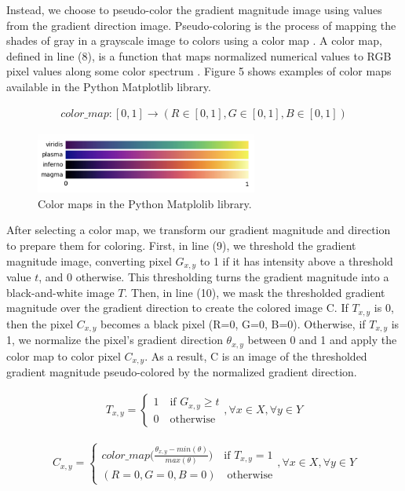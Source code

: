 \documentclass[runningheads]{llncs}
\begin{document}
Instead, we choose to pseudo-color the gradient magnitude image using values from the gradient direction image. Pseudo-coloring is the process of mapping the shades of gray in a grayscale image to colors using a color map \cite{pseudo_color}. A color map, defined in line (8), is a function that maps normalized numerical values to RGB pixel values along some color spectrum \cite{color_map}. Figure 5 shows examples of color maps available in the Python Matplotlib library.

\begin{align}
color\_map: [0, 1] \rightarrow (R \in [0,1], G \in [0,1], B \in [0,1])
\end{align}

\begin{figure}
\centering
\includegraphics[height=2cm]{images/color_map.png}
\caption{Color maps in the Python Matplolib library.}
\label{fig:example}
\end{figure}

After selecting a color map, we transform our gradient magnitude and direction to prepare them for coloring. First, in line (9), we threshold the gradient magnitude image, converting pixel $G_{x,y}$ to 1 if it has intensity above a threshold value $t$, and 0 otherwise. This thresholding turns the gradient magnitude into a black-and-white image $T$. Then, in line (10), we mask the thresholded gradient magnitude over the gradient direction to create the colored image C. If $T_{x,y}$ is 0, then the pixel $C_{x, y}$ becomes a black pixel (R=0, G=0, B=0). Otherwise, if $T_{x,y}$ is 1, we normalize the pixel's gradient direction $\theta_{x, y}$ between 0 and 1 and apply the color map to color pixel $C_{x, y}$. As a result, C is an image of the thresholded gradient magnitude pseudo-colored by the normalized gradient direction.

\begin{align}
T_{x,y} = \left\{
  \begin{array}{lr}
    1 \quad \text{if  } G_{x,y} \geq t \\
    0 \quad \text{otherwise}
  \end{array}
\right.
, \forall x \in X, \forall y \in Y
\end{align}

\begin{align}
C_{x,y} = \left\{
  \begin{array}{lr}
    color\_map \Big(\frac{\theta_{x,y} - min(\theta)}{max(\theta)} \Big) \quad \text{if  } T_{x,y} = 1 \\
    (R=0, G=0, B=0) \quad \text{otherwise}
  \end{array}
\right.
, \forall x \in X, \forall y \in Y
\end{align}
\end{document}
